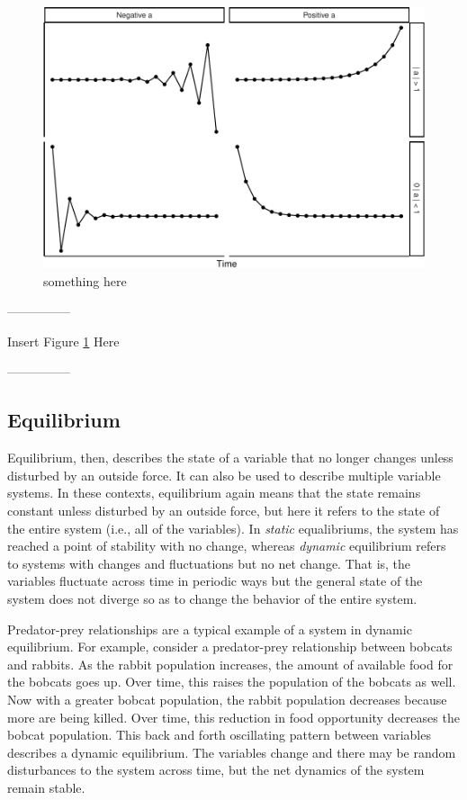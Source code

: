 \documentclass[]{article}
\begin{document}
\begin{figure}
\centering
\includegraphics{princ_math_files/figure-latex/unnamed-chunk-1-1.pdf}
\caption{something here\label{dynamics_plot}}
\end{figure}

\begin{center}

---------------

Insert Figure \ref{dynamics_plot} Here

---------------

\end{center}

\hypertarget{equilibrium}{%
\subsection{Equilibrium}\label{equilibrium}}

Equilibrium, then, describes the state of a variable that no longer
changes unless disturbed by an outside force. It can also be used to
describe multiple variable systems. In these contexts, equilibrium again
means that the state remains constant unless disturbed by an outside
force, but here it refers to the state of the entire system (i.e., all
of the variables). In \emph{static} equalibriums, the system has reached
a point of stability with no change, whereas \emph{dynamic} equilibrium
refers to systems with changes and fluctuations but no net change. That
is, the variables fluctuate across time in periodic ways but the general
state of the system does not diverge so as to change the behavior of the
entire system.

Predator-prey relationships are a typical example of a system in dynamic
equilibrium. For example, consider a predator-prey relationship between
bobcats and rabbits. As the rabbit population increases, the amount of
available food for the bobcats goes up. Over time, this raises the
population of the bobcats as well. Now with a greater bobcat population,
the rabbit population decreases because more are being killed. Over
time, this reduction in food opportunity decreases the bobcat
population. This back and forth oscillating pattern between variables
describes a dynamic equilibrium. The variables change and there may be
random disturbances to the system across time, but the net dynamics of
the system remain stable.
\end{document}
